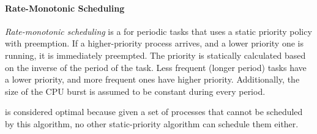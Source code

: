 \paragraph{Rate-Monotonic Scheduling}\label{par:Rate_Monotonic_Scheduling}
\begin{definition}\label{def:Rate_Monotonic_Scheduling}
  \emph{Rate-monotonic scheduling} is a  for periodic tasks that uses a static priority policy with preemption.
  If a higher-priority process arrives, and a lower priority one is running, it is immediately preempted.
  The priority is statically calculated based on the inverse of the period of the task.
  Less frequent (longer period) tasks have a lower priority, and more frequent ones have higher priority.
  Additionally, the size of the CPU burst is assumed to be constant during every period.
\end{definition}

 is considered optimal because given a set of processes that cannot be scheduled by this algorithm, no other static-priority algorithm can schedule them either.

